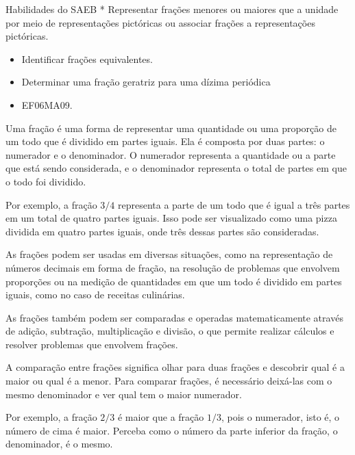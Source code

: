 Habilidades do SAEB * Representar frações menores ou maiores que a
unidade por meio de representações pictóricas ou associar frações a
representações pictóricas.

\begin{itemize}
\item
  Identificar frações equivalentes.
\item
  Determinar uma fração geratriz para uma dízima periódica
\end{itemize}


\begin{itemize}
\item EF06MA09.
\end{itemize}

Uma fração é uma forma de representar uma quantidade ou uma proporção de
um todo que é dividido em partes iguais. Ela é composta por duas partes:
o numerador e o denominador. O numerador representa a quantidade ou a
parte que está sendo considerada, e o denominador representa o total de
partes em que o todo foi dividido.

Por exemplo, a fração $3/4$ representa a parte de um todo que é igual a
três partes em um total de quatro partes iguais. Isso pode ser
visualizado como uma pizza dividida em quatro partes iguais, onde três
dessas partes são consideradas.

As frações podem ser usadas em diversas situações, como na representação
de números decimais em forma de fração, na resolução de problemas que
envolvem proporções ou na medição de quantidades em que um todo é
dividido em partes iguais, como no caso de receitas culinárias.

As frações também podem ser comparadas e operadas matematicamente
através de adição, subtração, multiplicação e divisão, o que permite
realizar cálculos e resolver problemas que envolvem frações.


A comparação entre frações significa olhar para duas frações e descobrir
qual é a maior ou qual é a menor. Para comparar frações, é necessário
deixá-las com o mesmo denominador e ver qual tem o maior numerador.

Por exemplo, a fração $2/3$ é maior que a fração $1/3$, pois o numerador,
isto é, o número de cima é maior. Perceba como o número da parte
inferior da fração, o denominador, é o mesmo.

